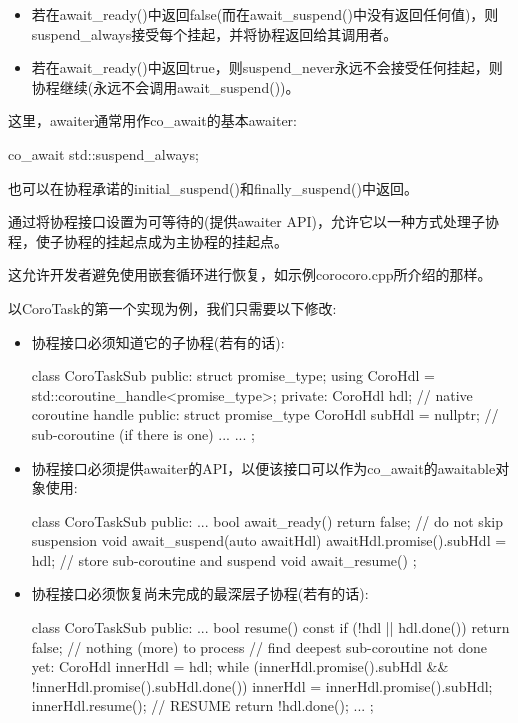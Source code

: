 \begin{itemize}
\item 
若在await\_ready()中返回false(而在await\_suspend()中没有返回任何值)，则suspend\_always接受每个挂起，并将协程返回给其调用者。

\item 
若在await\_ready()中返回true，则suspend\_never永远不会接受任何挂起，则协程继续(永远不会调用await\_suspend())。
\end{itemize}

这里，awaiter通常用作co\_await的基本awaiter:

\begin{cpp}
co_await std::suspend_always{};
\end{cpp}

也可以在协程承诺的initial\_suspend()和finally\_suspend()中返回。


通过将协程接口设置为可等待的(提供awaiter API)，允许它以一种方式处理子协程，使子协程的挂起点成为主协程的挂起点。

这允许开发者避免使用嵌套循环进行恢复，如示例corocoro.cpp所介绍的那样。

以CoroTask的第一个实现为例，我们只需要以下修改:

\begin{itemize}
\item 
协程接口必须知道它的子协程(若有的话):

\begin{cpp}
class CoroTaskSub {
public:
	struct promise_type;
	using CoroHdl = std::coroutine_handle<promise_type>;
private:
	CoroHdl hdl; // native coroutine handle
public:
	struct promise_type {
		CoroHdl subHdl = nullptr; // sub-coroutine (if there is one)
		...
	}
	...
};
\end{cpp}

\item
协程接口必须提供awaiter的API，以便该接口可以作为co\_await的awaitable对象使用:

\begin{cpp}
class CoroTaskSub {
	public:
	...
	bool await_ready() { return false; } // do not skip suspension
	void await_suspend(auto awaitHdl) {
		awaitHdl.promise().subHdl = hdl; // store sub-coroutine and suspend
	}
	void await_resume() { }
};
\end{cpp}

\item
协程接口必须恢复尚未完成的最深层子协程(若有的话):

\begin{cpp}
class CoroTaskSub {
	public:
	...
	bool resume() const {
		if (!hdl || hdl.done()) {
			return false; // nothing (more) to process
		}
		// find deepest sub-coroutine not done yet:
		CoroHdl innerHdl = hdl;
		while (innerHdl.promise().subHdl && !innerHdl.promise().subHdl.done()) {
			innerHdl = innerHdl.promise().subHdl;
		}
		innerHdl.resume(); // RESUME
		return !hdl.done();
	}
	...
};
\end{cpp}
\end{itemize}

